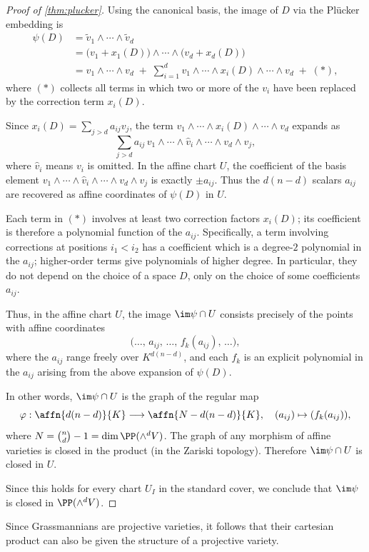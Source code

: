 \begin{proof}[Proof of \cref{thm:plucker}]
    Using the canonical basis, the image of $D$ via the Plücker embedding is
    \begin{align*}
        \psi(D) &= \tilde{v}_1 \wedge \cdots \wedge \tilde{v}_d\\
        &= \bigl(v_1 + x_1(D)\bigr) \wedge \cdots \wedge \bigl(v_d + x_d(D)\bigr)\\
        &= v_1 \wedge \cdots \wedge v_d
        \;+\; \sum_{i = 1}^d v_1 \wedge \cdots \wedge x_i(D) \wedge \cdots \wedge v_d
        \;+\; (\ast),
    \end{align*}
    where $(\ast)$ collects all terms in which two or more of the $v_i$ have
    been replaced by the correction term $x_i(D)$.

    Since $x_i(D) = \sum_{j>d} a_{ij} v_j$, the term
    $v_1 \wedge \cdots \wedge x_i(D) \wedge \cdots \wedge v_d$ expands as
    \[
        \sum_{j>d} a_{ij}\,
        v_1 \wedge \cdots \wedge \widehat{v}_i \wedge \cdots \wedge v_d \wedge v_j,
    \]
    where $\widehat{v}_i$ means $v_i$ is omitted.  In the affine chart $U$, the coefficient of
    the basis element ${v_1 \wedge \cdots \wedge \widehat{v}_i \wedge \cdots \wedge
    v_d \wedge v_j}$ is exactly $\pm a_{ij}$.  Thus the $d(n-d)$ scalars $a_{ij}$
    are recovered as affine coordinates of $\psi(D)$ in $U$.

    Each term in $(\ast)$ involves at least two correction factors $x_i(D)$; its
    coefficient is therefore a polynomial function of the $a_{ij}$.
    Specifically, a term involving corrections at positions $i_1 < i_2$ has a
    coefficient which is a degree-$2$ polynomial in the $a_{ij}$; higher-order terms
    give polynomials of higher degree.  In particular, they do not depend on the choice of a space $D$, only on the choice of some coefficients $a_{ij}$.

    Thus, in the affine chart $U$, the image $\im\psi \cap U$ consists
    precisely of the points with affine coordinates
    \[
        \bigl(\ldots,\, a_{ij},\, \ldots,\, f_k(a_{ij}),\, \ldots\bigr),
    \]
    where the $a_{ij}$ range freely over $K^{d(n-d)}$, and each $f_k$ is an
    explicit polynomial in the $a_{ij}$ arising from the above expansion of $\psi(D)$.

    In other words, $\im\psi \cap U$ is the graph of the regular map
    \[
        \varphi : \affn{d(n-d)}{K} \longrightarrow \affn{N - d(n-d)}{K},
        \quad (a_{ij}) \mapsto (f_k(a_{ij})),
    \]
    where $N = \binom{n}{d} - 1 = \dim\PP(\wedge^d V)$.  The graph of any morphism of
    affine varieties is closed in the product (in the Zariski topology). Therefore
    $\im\psi \cap U$ is closed in $U$.

    Since this holds for every chart $U_I$ in the standard cover, we conclude that $\im\psi$ is closed in $\PP(\wedge^d V)$.
\end{proof}
\noindent Since Grassmannians are projective varieties, it follows that their cartesian product can also be given the structure of a projective variety.

